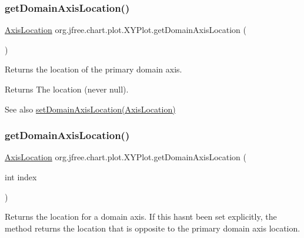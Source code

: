 \subsubsection{\texorpdfstring{get\+Domain\+Axis\+Location()}{getDomainAxisLocation()}\hspace{0.1cm}{\footnotesize\ttfamily [1/2]}}
{\footnotesize\ttfamily \mbox{\hyperlink{classorg_1_1jfree_1_1chart_1_1axis_1_1_axis_location}{Axis\+Location}} org.\+jfree.\+chart.\+plot.\+X\+Y\+Plot.\+get\+Domain\+Axis\+Location (\begin{DoxyParamCaption}{ }\end{DoxyParamCaption})}

Returns the location of the primary domain axis.

\begin{DoxyReturn}{Returns}
The location (never {\ttfamily null}).
\end{DoxyReturn}
\begin{DoxySeeAlso}{See also}
\mbox{\hyperlink{classorg_1_1jfree_1_1chart_1_1plot_1_1_x_y_plot_a39ce84df63e84f33fd34526351b70060}{set\+Domain\+Axis\+Location(\+Axis\+Location)}} 
\end{DoxySeeAlso}
\mbox{\label{classorg_1_1jfree_1_1chart_1_1plot_1_1_x_y_plot_adb9a01f67817531cfb75036a3c2c2df4}} 
\subsubsection{\texorpdfstring{get\+Domain\+Axis\+Location()}{getDomainAxisLocation()}\hspace{0.1cm}{\footnotesize\ttfamily [2/2]}}
{\footnotesize\ttfamily \mbox{\hyperlink{classorg_1_1jfree_1_1chart_1_1axis_1_1_axis_location}{Axis\+Location}} org.\+jfree.\+chart.\+plot.\+X\+Y\+Plot.\+get\+Domain\+Axis\+Location (\begin{DoxyParamCaption}\item[{int}]{index }\end{DoxyParamCaption})}

Returns the location for a domain axis. If this hasn\textquotesingle{}t been set explicitly, the method returns the location that is opposite to the primary domain axis location.


